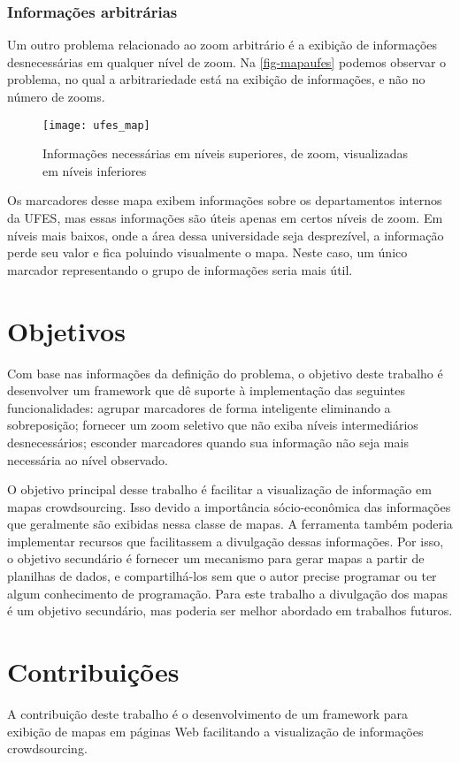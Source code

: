\subsubsection{Informações arbitrárias}
Um outro problema relacionado ao zoom arbitrário é a exibição de informações desnecessárias em qualquer nível de zoom. Na \autoref{fig-mapaufes} podemos observar o problema, no qual a arbitrariedade está na exibição de informações, e não no número de zooms. 
 \begin{figure}[htb]
	\caption{\label{fig-mapaufes}Informações necessárias em níveis superiores, de zoom, visualizadas em níveis inferiores}
	\begin{center}
	    \texttt{[image: ufes\_map]}
	\end{center}
\end{figure}
Os marcadores desse mapa exibem informações sobre os departamentos internos da UFES, mas essas informações são úteis apenas em certos níveis de zoom. Em níveis mais baixos, onde a área dessa universidade seja desprezível, a informação perde seu valor e fica poluindo visualmente o mapa. Neste caso, um único marcador representando o grupo de informações seria mais útil.

\section{Objetivos}
Com base nas informações da definição do problema, o objetivo deste trabalho é desenvolver um framework que dê suporte à implementação das seguintes funcionalidades: agrupar marcadores de forma inteligente eliminando a sobreposição; fornecer um zoom seletivo que não exiba níveis intermediários desnecessários; esconder marcadores quando sua informação não seja mais necessária ao nível observado.

O objetivo principal desse trabalho é facilitar a visualização de informação em mapas crowdsourcing. Isso devido a importância sócio-econômica das informações que geralmente são exibidas nessa classe de mapas. A ferramenta também poderia implementar recursos que facilitassem a divulgação dessas informações. Por isso, o objetivo secundário é fornecer um mecanismo para gerar mapas a partir de planilhas de dados, e compartilhá-los sem que o autor precise programar ou ter algum conhecimento de programação. Para este trabalho a divulgação dos mapas é um objetivo secundário, mas poderia ser melhor abordado em trabalhos futuros.
  
\section{Contribuições}
A contribuição deste trabalho é o desenvolvimento de um framework para exibição de mapas em páginas Web facilitando a visualização de informações crowdsourcing.

